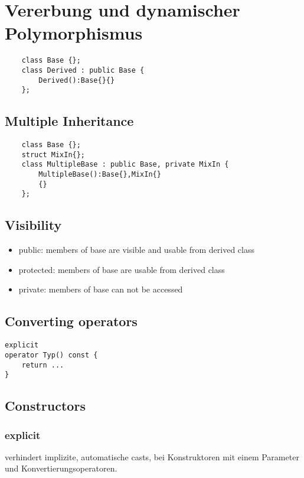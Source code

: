 \section{Vererbung und dynamischer Polymorphismus}
\begin{lstlisting}
	class Base {};
	class Derived : public Base {
		Derived():Base{}{}
	};
\end{lstlisting}
\subsection{Multiple Inheritance}
\begin{lstlisting}
	class Base {};
	struct MixIn{};
	class MultipleBase : public Base, private MixIn {
		MultipleBase():Base{},MixIn{}
		{}
	};
\end{lstlisting}


\subsection{Visibility}
\begin{itemize}
	\item public:
		members of base are visible and usable from derived class
	\item protected:
		members of base are usable from derived class
	\item private:
		members of base can not be accessed
\end{itemize}

\subsection{Converting operators}
\begin{lstlisting}
explicit
operator Typ() const {
	return ...
}
\end{lstlisting}

\subsection{Constructors}

\subsubsection{explicit}
verhindert implizite, automatische casts, bei Konstruktoren mit einem Parameter und Konvertierungsoperatoren.

